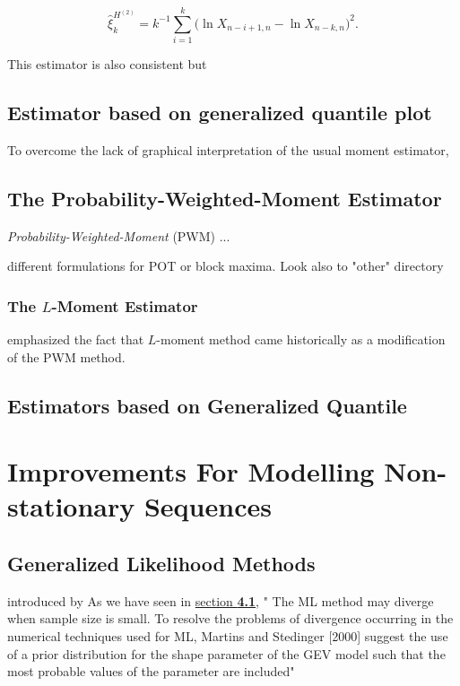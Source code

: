 \documentclass[11pt,a4paper,openany ]{book}
\begin{document}
\begin{equation*}
\hat{\xi}^{H^{(2)}}_k=k^{-1}\sum_{i=1}^k\big(\ln X_{n-i+1,n}-\ln X_{n-k,n}\big)^2.
\end{equation*}


This estimator is also consistent but  


\subsection*{Estimator based on generalized quantile plot}

To overcome the lack of graphical interpretation of the usual moment estimator, 




\subsection{The Probability-Weighted-Moment Estimator}

\emph{Probability-Weighted-Moment} (PWM)
...

different formulations for POT or block maxima. Look also to "other" directory
\cite{ribereau_skew_2016}


\subsubsection*{The $L$-Moment Estimator}
\cite{wang_lh_1997}

\cite{hosking_regional_1997} emphasized the fact that $L$-moment method came historically as a modification of the PWM method. 

\subsection{Estimators based on Generalized Quantile }



\section{Improvements For Modelling Non-stationary Sequences}\label{improvinf}
\subsection{Generalized Likelihood Methods}
introduced by \citet{martin_generalized_2000}
As we have seen in \hyperref[likintro]{section \textbf{4.1}}, 
" The ML method may diverge
when sample size is small. To resolve the problems of
divergence occurring in the numerical techniques used for
ML, Martins and Stedinger [2000] suggest the use of a prior
distribution for the shape parameter of the GEV model such
that the most probable values of the parameter are included"
\end{document}
